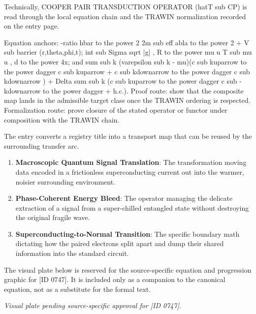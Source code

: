 Technically, COOPER PAIR TRANSDUCTION OPERATOR (hatT sub CP) is read through the local equation chain and the TRAWIN normalization recorded on the entry page.

Equation anchors: -ratio hbar to the power 2 2m sub eff abla to the power 2 + V sub barrier (r,theta,phi,t); int sub Sigma sqrt |g| , R to the power mu u T sub mu u , d to the power 4x; and sum sub k (varepsilon sub k - mu)(c sub kuparrow to the power dagger c sub kuparrow + c sub kdownarrow to the power dagger c sub kdownarrow ) + Delta sum sub k (c sub kuparrow to the power dagger c sub -kdownarrow to the power dagger + h.c.). Proof route: show that the composite map lands in the admissible target class once the TRAWIN ordering is respected. Formalization route: prove closure of the stated operator or functor under composition with the TRAWIN chain.

The entry converts a registry title into a transport map that can be reused by the surrounding transfer arc.
\endgroup

\begin{enumerate}[leftmargin=1.6em,itemsep=6pt,topsep=4pt]
\item \textbf{Macroscopic Quantum Signal Translation}: The transformation moving data encoded in a frictionless superconducting current out into the warmer, noisier surrounding environment.
\item \textbf{Phase-Coherent Energy Bleed}: The operator managing the delicate extraction of a signal from a super-chilled entangled state without destroying the original fragile wave.
\item \textbf{Superconducting-to-Normal Transition}: The specific boundary math dictating how the paired electrons split apart and dump their shared information into the standard circuit.
\end{enumerate}

\begingroup\footnotesize\sloppy
The visual plate below is reserved for the source-specific equation and progression graphic for [ID 0747]. It is included only as a companion to the canonical equation, not as a substitute for the formal text.
\par\endgroup
\begingroup\footnotesize\itshape
Visual plate pending source-specific approval for [ID 0747].
\par\endgroup

